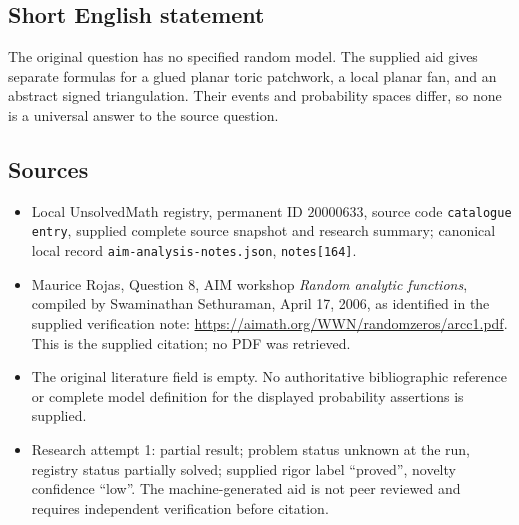 \documentclass[11pt]{article}
\begin{document}
\subsection{Short English statement}
The original question has no specified random model. The supplied aid gives separate formulas for a glued planar toric patchwork, a local planar fan, and an abstract signed triangulation. Their events and probability spaces differ, so none is a universal answer to the source question.
\subsection{Sources}
\begin{itemize}
\item Local UnsolvedMath registry, permanent ID $20000633$, source code \texttt{catalogue entry}, supplied complete source snapshot and research summary; canonical local record \texttt{aim-analysis-notes.json}, \texttt{notes[164]}.
\item Maurice Rojas, Question 8, AIM workshop \emph{Random analytic functions}, compiled by Swaminathan Sethuraman, April 17, 2006, as identified in the supplied verification note: \url{https://aimath.org/WWN/randomzeros/arcc1.pdf}. This is the supplied citation; no PDF was retrieved.
\item The original literature field is empty. No authoritative bibliographic reference or complete model definition for the displayed probability assertions is supplied.
\item Research attempt 1: partial result; problem status unknown at the run, registry status partially solved; supplied rigor label ``proved'', novelty confidence ``low''. The machine-generated aid is not peer reviewed and requires independent verification before citation.
\end{itemize}
\end{document}
